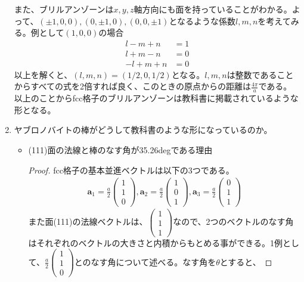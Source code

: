 \documentclass[a4paper,11pt,dvipdfmx]{jsarticle}
\begin{document}
\begin{enumerate}
      また、ブリルアンゾーンは$x, y, z$軸方向にも面を持っていることがわかる。よって、$(\pm 1, 0, 0), (0, \pm 1, 0), (0, 0, \pm 1)$となるような係数$l, m, n$を考えてみる。例として$(1, 0, 0)$の場合
      \begin{align*}
        l - m + n &= 1 \\
        l + m - n &= 0 \\
        -l + m + n &= 0 
      \end{align*}
      以上を解くと、$(l, m, n) = (1/2, 0, 1/2)$となる。$l, m, n$は整数であることからすべての式を2倍すれば良く、このときの原点からの距離は$\displaystyle \frac{4\pi}{a}$である。
      以上のことからfcc格子のブリルアンゾーンは教科書に掲載されているような形となる。
    \item ヤブロノバイトの棒がどうして教科書のような形になっているのか。
      \begin{itemize}
        \item (111)面の法線と棒のなす角が35.26degである理由
        \begin{proof}
          fcc格子の基本並進ベクトルは以下の3つである。
          \begin{align*}
            \boldsymbol{a}_1 = \frac{a}{2}\begin{pmatrix} 1 \\ 1 \\ 0\end{pmatrix}, 
            \boldsymbol{a}_2 = \frac{a}{2}\begin{pmatrix} 1 \\ 0 \\ 1\end{pmatrix}, 
            \boldsymbol{a}_3 = \frac{a}{2}\begin{pmatrix} 0 \\ 1 \\ 1\end{pmatrix}
          \end{align*}
          また面(111)の法線ベクトルは、$\begin{pmatrix}1 \\ 1 \\ 1\end{pmatrix}$なので、2つのベクトルのなす角はそれぞれのベクトルの大きさと内積からもとめる事ができる。1例として、$\displaystyle \frac{a}{2}\begin{pmatrix} 1 \\ 1 \\ 0\end{pmatrix}$とのなす角について述べる。なす角を$\theta$とすると、

\end{proof}
\end{itemize}
\end{enumerate}
\end{document}
